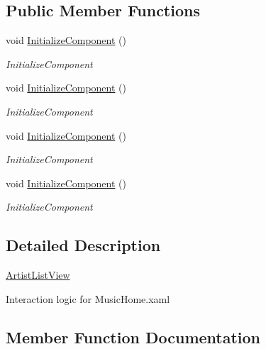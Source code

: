 \subsection*{Public Member Functions}
\begin{DoxyCompactItemize}
\item 
void \hyperlink{class_presentation_1_1_view_1_1_list_1_1_artist_list_view_a64ae6fa24884ea06d766083a1576dc4d}{Initialize\+Component} ()
\begin{DoxyCompactList}\small\item\em Initialize\+Component \end{DoxyCompactList}\item 
void \hyperlink{class_presentation_1_1_view_1_1_list_1_1_artist_list_view_a64ae6fa24884ea06d766083a1576dc4d}{Initialize\+Component} ()
\begin{DoxyCompactList}\small\item\em Initialize\+Component \end{DoxyCompactList}\item 
void \hyperlink{class_presentation_1_1_view_1_1_list_1_1_artist_list_view_a64ae6fa24884ea06d766083a1576dc4d}{Initialize\+Component} ()
\begin{DoxyCompactList}\small\item\em Initialize\+Component \end{DoxyCompactList}\item 
void \hyperlink{class_presentation_1_1_view_1_1_list_1_1_artist_list_view_a64ae6fa24884ea06d766083a1576dc4d}{Initialize\+Component} ()
\begin{DoxyCompactList}\small\item\em Initialize\+Component \end{DoxyCompactList}\end{DoxyCompactItemize}


\subsection{Detailed Description}
\hyperlink{class_presentation_1_1_view_1_1_list_1_1_artist_list_view}{Artist\+List\+View} 

Interaction logic for Music\+Home.\+xaml 

\subsection{Member Function Documentation}
\mbox{\label{class_presentation_1_1_view_1_1_list_1_1_artist_list_view_a64ae6fa24884ea06d766083a1576dc4d}} 
